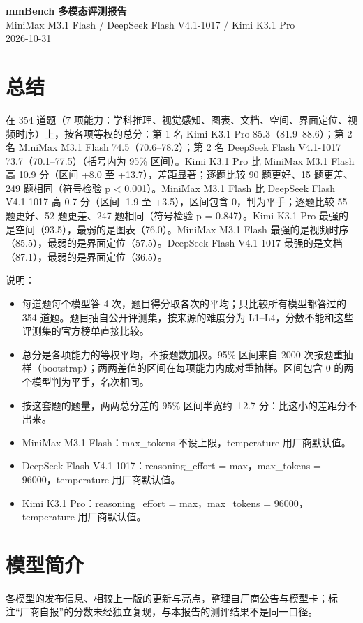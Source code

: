 \documentclass[11pt,a4paper,fontset=none]{ctexart}
\begin{document}
\begin{center}
{\LARGE\bfseries mmBench 多模态评测报告}\\[0.5em]
{\Large MiniMax M3.1 Flash / DeepSeek Flash V4.1-1017 / Kimi K3.1 Pro}\\[0.4em]
{\small 2026-10-31}
\end{center}
\section{总结}
在 354 道题（7 项能力：学科推理、视觉感知、图表、文档、空间、界面定位、视频时序）上，按各项等权的总分：第 1 名 Kimi K3.1 Pro 85.3（81.9–88.6）；第 2 名 MiniMax M3.1 Flash 74.5（70.6–78.2）；第 2 名 DeepSeek Flash V4.1-1017 73.7（70.1–77.5）（括号内为 95\% 区间）。Kimi K3.1 Pro 比 MiniMax M3.1 Flash 高 10.9 分（区间 +8.0 至 +13.7），差距显著；逐题比较 90 题更好、15 题更差、249 题相同（符号检验 p < 0.001）。MiniMax M3.1 Flash 比 DeepSeek Flash V4.1-1017 高 0.7 分（区间 -1.9 至 +3.5），区间包含 0，判为平手；逐题比较 55 题更好、52 题更差、247 题相同（符号检验 p = 0.847）。Kimi K3.1 Pro 最强的是空间（93.5），最弱的是图表（76.0）。MiniMax M3.1 Flash 最强的是视频时序（85.5），最弱的是界面定位（57.5）。DeepSeek Flash V4.1-1017 最强的是文档（87.1），最弱的是界面定位（36.5）。
\par 说明：
\begin{itemize}
\item 每道题每个模型答 4 次，题目得分取各次的平均；只比较所有模型都答过的 354 道题。题目抽自公开评测集，按来源的难度分为 L1–L4，分数不能和这些评测集的官方榜单直接比较。
\item 总分是各项能力的等权平均，不按题数加权。95\% 区间来自 2000 次按题重抽样（bootstrap）；两两差值的区间在每项能力内成对重抽样。区间包含 0 的两个模型判为平手，名次相同。
\item 按这套题的题量，两两总分差的 95\% 区间半宽约 ±2.7 分：比这小的差距分不出来。
\item MiniMax M3.1 Flash：max\_tokens 不设上限，temperature 用厂商默认值。
\item DeepSeek Flash V4.1-1017：reasoning\_effort = max，max\_tokens = 96000，temperature 用厂商默认值。
\item Kimi K3.1 Pro：reasoning\_effort = max，max\_tokens = 96000，temperature 用厂商默认值。
\end{itemize}
\section{模型简介}
各模型的发布信息、相较上一版的更新与亮点，整理自厂商公告与模型卡；标注“厂商自报”的分数未经独立复现，与本报告的测评结果不是同一口径。
\end{document}
